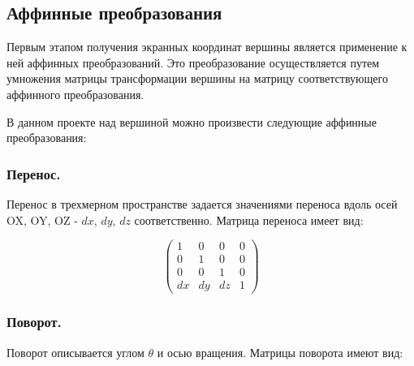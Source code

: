 \subsection{Аффинные преобразования}

Первым этапом получения экранных координат вершины является применение к ней аффинных преобразований. Это преобразование осуществляется путем умножения матрицы трансформации вершины на матрицу соответствующего аффинного преобразования.

В данном проекте над вершиной можно произвести следующие аффинные преобразования:

\subsubsection*{Перенос.}

Перенос в трехмерном пространстве задается значениями переноса вдоль осей OX, OY, OZ - $dx$, $dy$, $dz$ соответственно. Матрица переноса имеет вид:

\begin{equation}
	\begin{pmatrix}
		1  & 0  & 0  & 0 \\
		0  & 1  & 0  & 0 \\
		0  & 0  & 1  & 0 \\
		dx & dy & dz & 1
	\end{pmatrix}
\end{equation}

\subsubsection*{Поворот.}
	
Поворот описывается углом $\theta$ и осью вращения. Матрицы поворота имеют вид:

